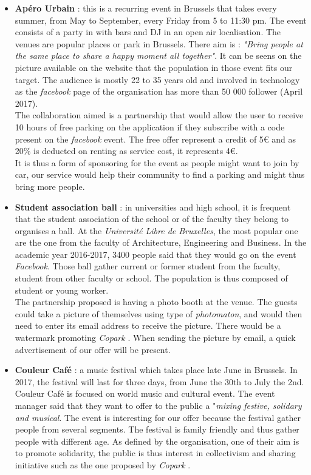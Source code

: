 \documentclass[12pt,a4paper,oneside]{book}
\newcommand{\bp}{\textit{Copark }}
\begin{document}
\begin{itemize}
\item \textbf{Apéro Urbain} : this is a recurring event in Brussels that takes every summer, from May to September, every Friday from 5 to 11:30 pm. The event consists of a party in with bars and DJ in an open air localisation. The venues are popular places or park in Brussels. There aim is : \textit{"Bring people at the same place to share a happy moment all together"}.\cite{aperourbain} It can be seens on the picture available on the website that the population in those event fits our target. The audience is mostly 22 to 35 years old and involved in technology as the \textit{facebook} page of the organisation has more than 50 000 follower (April 2017).\\
The collaboration aimed is a partnership that would allow the user to receive 10 hours of free parking on the application if they subscribe with a code present on the \textit{facebook} event. The free offer represent a credit of 5\euro{} and as 20\% is deducted on renting as service cost, it represents 4\euro{}.\\
It is thus a form of sponsoring for the event as people might want to join by car, our service would help their community to find a parking and might thus bring more people.
\item \textbf{Student association ball} : in universities and high school, it is frequent that the student association of the school or of the faculty they belong to organises a ball. At the \textit{Université Libre de Bruxelles}, the most popular one are the one from the faculty of Architecture, Engineering and Business. In the academic year 2016-2017, 3400 people said that they would go on the event \textit{Facebook}. Those ball gather current or former student from the faculty, student from other faculty or school. The population is thus composed of student or young worker.\\
The partnership proposed is having a photo booth at the venue. The guests could take a picture of themselves using type of \textit{photomaton}, and would then need to enter its email address to receive the picture. There would be a watermark promoting \bp. When sending the picture by email, a quick advertisement of our offer will be present.
\item \textbf{Couleur Café} : a music festival which takes place late June in Brussels. In 2017, the festival will last for three days, from June the 30th to July the 2nd. Couleur Café is focused on world music and cultural event. The event manager said that they want to offer to the public a "\textit{mixing festive, solidary and musical}.\cite{rtbfcc} The event is interesting for our offer because the festival gather people from several segments. The festival is family friendly and thus gather people with different age. As defined by the organisation, one of their aim is to promote solidarity, the public is thus interest in collectivism and sharing initiative such as the one proposed by \bp.\\

\end{itemize}
\end{document}
